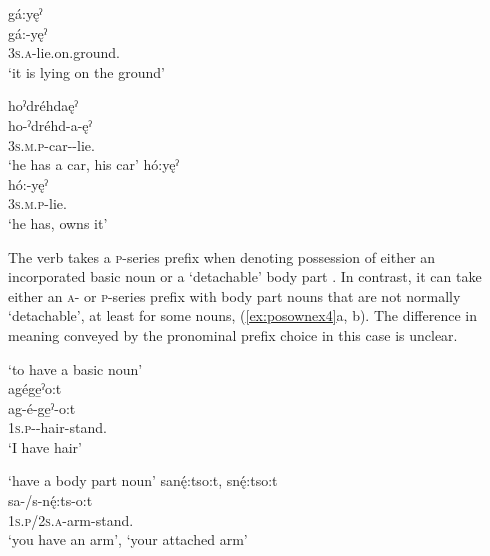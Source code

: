 \ea\label{ex:posownex2} 
\ea gá:yęˀ \\
\gll gá:-yęˀ\\
\textsc{3s.a}-lie.on.ground.{\stative}\\
\glt ‘it is lying on the ground’

\newpage
\ex  hoˀdréhdaęˀ\\
\gll ho-ˀdréhd-a-ęˀ\\
 \textsc{3s.m.p}-car-{\joinerA}-lie.{\stative}\\
\glt `he has a car, his car'
\ex hó:yęˀ\\
\gll hó:-yęˀ\\
 \textsc{3s.m.p}-lie.{\stative}\\
\glt `he has, owns it'
\z
\z

The verb  takes a \textsc{p}-series prefix when denoting possession of either an incorporated basic noun or a ‘detachable’ body part . In contrast, it can take either an \textsc{a}- or \textsc{p}-series prefix with body part nouns that are not normally ‘detachable’, at least for some nouns, (\ref{ex:posownex4}a, b). The difference in meaning conveyed by the pronominal prefix choice in this case is unclear.

\ea\label{ex:posownex3}  ‘to have a basic noun’\\
 agége̱ˀo:t\\
\gll ag-é-ge̱ˀ-o:t\\
 \textsc{1s.p}-{\joinerE}-hair-stand.{\stative}\\
\glt `I have hair'
\z

 
\ea\label{ex:posownex4}  ‘have a body part noun’
\ea sanę́:tso:t, snę́:tso:t \\
\gll sa-/s-nę́:ts-o:t\\
 \textsc{1s.p}/\textsc{2s.a}-arm-stand.{\stative}\\
\glt ‘you have an arm’, `your attached arm'


